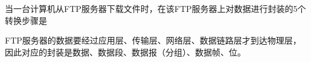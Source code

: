 \question 当一台计算机从FTP服务器下载文件时，在该FTP服务器上对数据进行封装的5个转换步骤是
\par{}
\begin{solution}FTP服务器的数据要经过应用层、传输层、网络层、数据链路层才到达物理层，因此对应的封装是数据、数据段、数据报（分组）、数据帧、位。
\end{solution}
